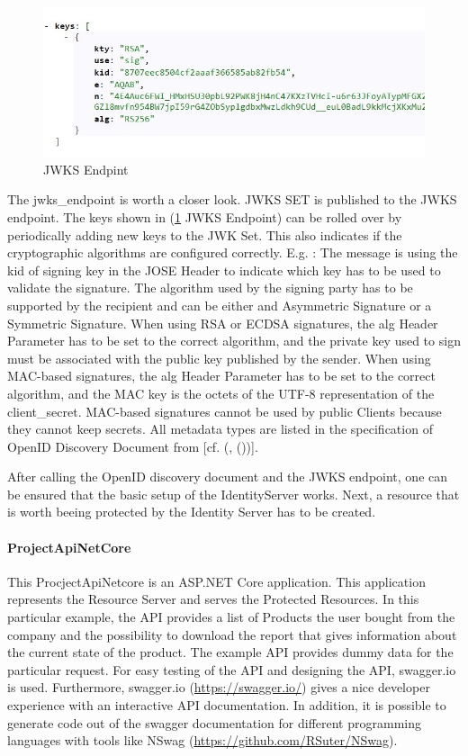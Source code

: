 \begin{figure}[h]
	\centering
	\includegraphics[width=0.7\linewidth]{images/jwkDiscovoryDocument}
	\caption{JWKS Endpint}
	\label{fig:jwkdiscovorydocument}
\end{figure}

The jwks\_endpoint is worth a closer look. JWKS SET is published to the JWKS endpoint. The keys shown in (\ref{fig:jwkdiscovorydocument} JWKS Endpoint) can be rolled over by periodically adding new keys to the JWK Set. This also indicates if the cryptographic algorithms are configured correctly. E.g. : The message is using the kid of signing key in the JOSE Header to indicate which key has to be used to validate the signature. The algorithm used by the signing party has to be supported by the recipient and can be either and Asymmetric Signature or a Symmetric Signature. 
When using RSA or ECDSA signatures, the alg Header Parameter has to be set to the correct algorithm, and the private key used to sign must be associated with the public key published by the sender. When using MAC-based signatures, the alg Header Parameter has to be set to the correct algorithm, and the MAC key is the octets of the UTF-8 representation of the client\_secret. MAC-based signatures cannot be used by public Clients because they cannot keep secrets.  All metadata types are listed in the specification of OpenID Discovery Document from \cite{Sakimura:OIDCD} [cf. (\cite{Sakimura:OIDCC}, (\cite{Sakimura:OIDCD}))]. 

After calling the OpenID discovery document and the JWKS endpoint, one can be ensured that the basic setup of the IdentityServer works. Next, a resource that is worth beeing protected by the Identity Server has to be created. 

\paragraph{ProjectApiNetCore}

This ProcjectApiNetcore is an ASP.NET Core application. This application represents the Resource Server and serves the Protected Resources. In this particular example, the API provides a list of Products the user bought from the company and the possibility to download the report that gives information about the current state of the product. The example API provides dummy data for the particular request. For easy testing of the API and designing the API, swagger.io is used. Furthermore, swagger.io (\url{https://swagger.io/}) gives a nice developer experience with an interactive API documentation. In addition, it is possible to generate code out of the swagger documentation for different programming languages with tools like NSwag (\url{https://github.com/RSuter/NSwag}).

